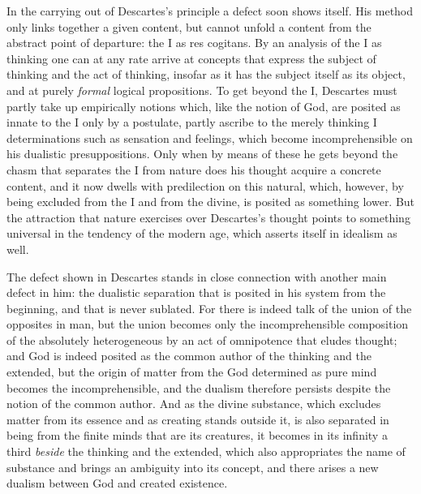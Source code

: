 In the carrying out of Descartes's principle a defect soon shows itself. His method only links together a given
content, but cannot unfold a content from the abstract point of departure: the I as res cogitans. By an analysis of the I as thinking one can at any rate arrive at concepts that express the subject of thinking and the act of thinking, insofar as it has the subject itself as its object, and at purely \emph{formal} logical propositions. To get beyond the I, Descartes must partly take up empirically notions which, like the notion of God, are posited as innate to the I only by a postulate, partly ascribe to the merely thinking I determinations such as sensation and feelings, which become incomprehensible on his dualistic presuppositions. Only when by means of these he gets beyond the chasm that separates the I from nature does his thought acquire a concrete content, and it now dwells with predilection on this natural, which, however, by being excluded from the I and from the divine, is posited as something lower. But the attraction that nature exercises over Descartes's thought points to something universal in the tendency of the modern age, which asserts itself in idealism as well.

The defect shown in Descartes stands in close connection with another main defect in him: the dualistic separation that is posited in his system from the beginning, and that is never sublated. For there is indeed talk of the union of the opposites in man, but the union becomes only the incomprehensible composition of the absolutely heterogeneous by an act of omnipotence that eludes thought; and God is indeed posited as the common author of the thinking and the extended, but the origin of matter from the God determined as pure mind becomes the incomprehensible, and the dualism therefore persists despite the notion of the common author. And as the divine substance, which excludes matter from its essence and as creating stands outside it, is also separated in being from the finite minds that are its creatures, it becomes in its infinity a third \emph{beside} the thinking and the extended, which also appropriates the name of substance and brings an ambiguity
into its concept, and there arises a new dualism between God and created existence.


